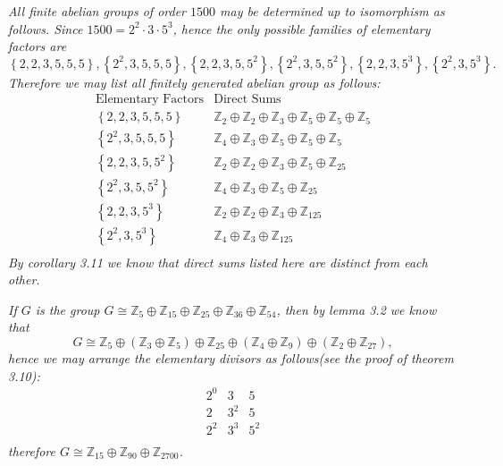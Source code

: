 \begin{example}\em
All finite abelian groups of order $1500$ may be determined up to isomorphism as follows. Since $1500=2^2\cdot 3\cdot 5^3$, hence the only possible families of elementary factors are 
$$
\left\{ 2,2,3,5,5,5 \right\} ,\left\{ 2^2,3,5,5,5 \right\} ,\left\{ 2,2,3,5,5^2 \right\} ,\left\{ 2^2,3,5,5^2 \right\} ,\left\{ 2,2,3,5^3 \right\} ,\left\{ 2^2,3,5^3 \right\} .
$$
Therefore we may list all finitely generated abelian group as follows:
$$
\begin{matrix}
	\text{Elementary Factors}&		\text{Direct Sums}\\
	\left\{ 2,2,3,5,5,5 \right\}&		\mathbb{Z} _2\oplus \mathbb{Z} _2\oplus \mathbb{Z} _3\oplus \mathbb{Z} _5\oplus \mathbb{Z} _5\oplus \mathbb{Z} _5\\
	\left\{ 2^2,3,5,5,5 \right\}&		\mathbb{Z} _4\oplus \mathbb{Z} _3\oplus \mathbb{Z} _5\oplus \mathbb{Z} _5\oplus \mathbb{Z} _5\\
	\left\{ 2,2,3,5,5^2 \right\}&		\mathbb{Z} _2\oplus \mathbb{Z} _2\oplus \mathbb{Z} _3\oplus \mathbb{Z} _5\oplus \mathbb{Z} _{25}\\
	\left\{ 2^2,3,5,5^2 \right\}&		\mathbb{Z} _4\oplus \mathbb{Z} _3\oplus \mathbb{Z} _5\oplus \mathbb{Z} _{25}\\
	\left\{ 2,2,3,5^3 \right\}&		\mathbb{Z} _2\oplus \mathbb{Z} _2\oplus \mathbb{Z} _3\oplus \mathbb{Z} _{125}\\
	\left\{ 2^2,3,5^3 \right\}&		\mathbb{Z} _4\oplus \mathbb{Z} _3\oplus \mathbb{Z} _{125}\\
\end{matrix}
$$
By corollary 3.11 we know that direct sums listed here are distinct from each other.
\end{example}
\begin{example}\em
If $G$ is the group $G\cong\mathbb{Z}_5\oplus\mathbb{Z}_{15}\oplus\mathbb{Z}_{25}\oplus\mathbb{Z}_{36}\oplus\mathbb{Z}_{54}$, then by lemma 3.2 we know that 
$$
G\cong \mathbb{Z} _5\oplus \left( \mathbb{Z} _3\oplus \mathbb{Z} _5 \right) \oplus \mathbb{Z} _{25}\oplus \left( \mathbb{Z} _4\oplus \mathbb{Z} _9 \right) \oplus \left( \mathbb{Z} _2\oplus \mathbb{Z} _{27} \right) ,
$$
hence we may arrange the elementary divisors as follows(see the proof of theorem 3.10):
$$
\begin{matrix}
	2^0&		3&		5\\
	2&		3^2&		5\\
	2^2&		3^3&		5^2\\
\end{matrix}
$$
therefore $G\cong\mathbb{Z}_{15}\oplus\mathbb{Z}_{90}\oplus\mathbb{Z}_{2700}$.
\end{example}
